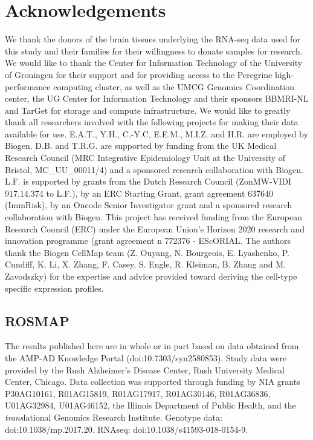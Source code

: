 \section*{Acknowledgements}
We thank the donors of the brain tissues underlying the RNA-seq data used for this study and their families for their willingness to donate samples for research. We would like to thank the Center for Information Technology of the University of Groningen for their support and for providing access to the Peregrine high-performance computing cluster, as well as the UMCG Genomics Coordination center, the UG Center for Information Technology and their sponsors BBMRI-NL and TarGet for storage and compute infrastructure. We would like to greatly thank all researchers involved with the following projects for making their data available for use. E.A.T., Y.H., C.-Y.C, E.E.M., M.I.Z. and H.R. are employed by Biogen. D.B. and T.R.G. are supported by funding from the UK Medical Research Council (MRC Integrative Epidemiology Unit at the University of Bristol, MC\_UU\_00011/4) and a sponsored research collaboration with Biogen. L.F. is supported by grants from the Dutch Research Council (ZonMW-VIDI 917.14.374 to L.F.), by an ERC Starting Grant, grant agreement 637640 (ImmRisk), by an Oncode Senior Investigator grant and a sponsored research collaboration with Biogen. This project has received funding from the European Research Council (ERC) under the European Union's Horizon 2020 research and innovation programme (grant agreement n 772376 - EScORIAL. The authors thank the Biogen CellMap team (Z. Ouyang, N. Bourgeois, E. Lyashenko, P. Cundiff, K. Li, X. Zhang, F. Casey, S. Engle, R. Kleiman, B. Zhang and M. Zavodszky) for the expertise and advice provided toward deriving the cell-type specific expression profiles. 

\subsection*{ROSMAP}

The results published here are in whole or in part based on data obtained from the AMP-AD Knowledge Portal (doi:10.7303/syn2580853). Study data were provided by the Rush Alzheimer’s Disease Center, Rush University Medical Center, Chicago. Data collection was supported through funding by NIA grants P30AG10161, R01AG15819, R01AG17917, R01AG30146, R01AG36836, U01AG32984, U01AG46152, the Illinois Department of Public Health, and the \textit{trans}lational Genomics Research Institute. 
Genotype data: doi:10.1038/mp.2017.20. RNAseq: doi:10.1038/s41593-018-0154-9.  


